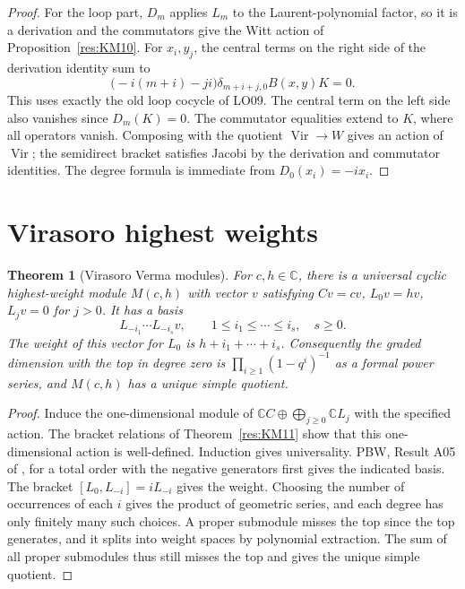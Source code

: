 \documentclass[11pt,oneside,openany]{book}
\newtheorem{theorem}{Theorem}[chapter]
\theoremstyle{definition}
\theoremstyle{remark}
\begin{document}
\begin{proof}
For the loop part, \(D_m\) applies \(L_m\) to the Laurent-polynomial
factor, so it is a derivation and the commutators give the Witt
action of Proposition~\ref{res:KM10}. For \(x_i,y_j\), the central
terms on the right side of the derivation identity sum to
\[
 \bigl(-i(m+i)-ji\bigr)\delta_{m+i+j,0}B(x,y)K=0 .
\]
This uses exactly the old loop cocycle of LO09. The central
term on the left side also vanishes since \(D_m(K)=0\).
The commutator equalities extend to \(K\), where all operators
vanish. Composing with the quotient
\(\operatorname{Vir}\to W\) gives an action of \(\operatorname{Vir}\);
the semidirect bracket satisfies Jacobi by the derivation and
commutator identities. The degree formula is immediate from
\(D_0(x_i)=-i x_i\).
\end{proof}

\section{Virasoro highest weights}

\begin{theorem}[Virasoro Verma modules]
\label{res:KM13}
For \(c,h\in\mathbb C\), there is a universal cyclic
highest-weight module \(M(c,h)\) with vector \(v\) satisfying
\(Cv=cv\), \(L_0v=hv\), \(L_jv=0\) for \(j>0\).
It has a basis
\[
 L_{-i_1}\cdots L_{-i_s}v,\qquad
       1\le i_1\le\cdots\le i_s,\quad s\ge0 .
\]
The weight of this vector for \(L_0\) is \(h+i_1+\cdots+i_s\).
Consequently the graded dimension with the top in degree zero is
\(\prod_{i\ge1}(1-q^i)^{-1}\) as a formal power series,
and \(M(c,h)\) has a unique simple quotient.
\end{theorem}

\begin{proof}
Induce the one-dimensional module of
\(\mathbb C C\oplus\bigoplus_{j\ge0}\mathbb C L_j\)
with the specified action. The bracket relations of
Theorem~\ref{res:KM11} show that this one-dimensional action
is well-defined. Induction gives universality. PBW, Result A05 of
\cite[PDF pp.~8--9]{mg-lie}, for a total order with the negative
generators first gives the indicated basis.
The bracket \([L_0,L_{-i}]=iL_{-i}\) gives the weight.
Choosing the number of occurrences of each \(i\) gives the product
of geometric series, and each degree has only finitely many such
choices. A proper submodule misses the top since the top generates,
and it splits into weight spaces by polynomial extraction.
The sum of all proper submodules thus still misses the top
and gives the unique simple quotient.
\end{proof}
\end{document}
